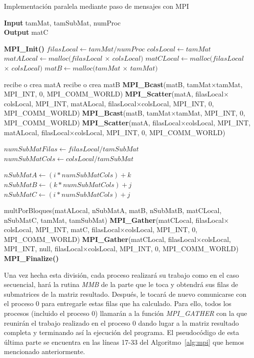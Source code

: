 \documentclass[a4paper,12pt]{article}
\begin{document}
\begin{algorithm}[htbp]
\caption{Implementación paralela mediante paso de mensajes con MPI}
\hspace*{\algorithmicindent} \textbf{Input} tamMat, tamSubMat, numProc\\
\hspace*{\algorithmicindent} \textbf{Output} matC
\begin{algorithmic}[1]


\State \textbf{MPI\_Init()}
\State $filasLocal \leftarrow tamMat/numProc$
\State $colsLocal \leftarrow tamMat$
\State $matALocal \leftarrow malloc(filasLocal$ $\times$ $colsLocal)$
\State $matCLocal \leftarrow malloc(filasLocal$ $\times$ $colsLocal)$
\State $matB \leftarrow malloc(tamMat$ $\times$ $tamMat)$

    \State recibe o crea matA
    \State recibe o crea matB
    \State \textbf{MPI\_Bcast}(matB, tamMat$\times$tamMat, MPI\_INT, 0, MPI\_COMM\_WORLD)
    \State \textbf{MPI\_Scatter}(matA, filasLocal$\times$colsLocal, MPI\_INT, matALocal, filasLocal$\times$colsLocal, MPI\_INT, 0, MPI\_COMM\_WORLD)
\Else
    \State \textbf{MPI\_Bcast}(matB, tamMat$\times$tamMat, MPI\_INT, 0, MPI\_COMM\_WORLD)
    \State \textbf{MPI\_Scatter}(matA, filasLocal$\times$colsLocal, MPI\_INT, matALocal, filasLocal$\times$colsLocal, MPI\_INT, 0, MPI\_COMM\_WORLD)
\EndIf 

\State $numSubMatFilas \leftarrow filasLocal/tamSubMat$
\State $numSubMatCols \leftarrow colsLocal/tamSubMat$

	\State $nSubMatA \leftarrow (i * numSubMatCols) + k$ 
	\State $nSubMatB \leftarrow  (k * numSubMatCols) + j$
	\State $nSubMatC \leftarrow  (i * numSubMatCols) + j$
	
	\State multPorBloques(matALocal, nSubMatA, matB, nSubMatB, matCLocal, nSubMatC, tamMat, tamSubMat)
\EndFor
\EndFor
\EndFor
{} 
    \State \textbf{MPI\_Gather}(matCLocal, filasLocal$\times$colsLocal, MPI\_INT, matC, filasLocal$\times$colsLocal, MPI\_INT, 0, MPI\_COMM\_WORLD)
\Else
    \State \textbf{MPI\_Gather}(matCLocal, filasLocal$\times$colsLocal, MPI\_INT, null, filasLocal$\times$colsLocal, MPI\_INT, 0, MPI\_COMM\_WORLD)
\EndIf 
\State \textbf{MPI\_Finalize()}
\end{algorithmic}
\label{alg:mpi}
\end{algorithm}

Una vez hecha esta división, cada proceso realizará su trabajo como en el caso secuencial, hará la rutina {\it MMB} de la parte que le toca y obtendrá sus filas de submatrices de la matriz resultado. Después, le tocará de nuevo comunicarse con el proceso 0 para entregarle estas filas que ha calculado. Para ello, todos los procesos (incluido el proceso 0) llamarán a la función {\it MPI\_GATHER} con la que reunirán el trabajo realizado en el proceso 0 dando lugar a la matriz resultado completa y terminando así la ejecución del programa. El pseudocódigo de esta última parte se encuentra en las líneas 17-33 del Algoritmo~\ref{alg:mpi} que hemos mencionado anteriormente.
\end{document}
